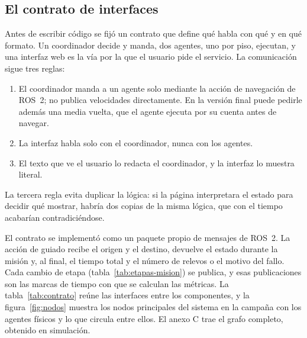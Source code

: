 \subsection{El contrato de interfaces}
\label{sec:contrato}

Antes de escribir código se fijó un contrato que define qué habla con qué y en qué formato. Un coordinador decide y manda, dos agentes, uno
por piso, ejecutan, y una interfaz web es la vía por la que el usuario pide el servicio. La comunicación sigue tres reglas:

\begin{enumerate}[leftmargin=*]
  \item El coordinador manda a un agente solo mediante la acción de navegación
    de ROS~2; no publica velocidades directamente. En la versión final puede
    pedirle además una media vuelta, que el agente ejecuta por su cuenta antes de navegar.
  \item La interfaz habla solo con el coordinador, nunca con los agentes.
  \item El texto que ve el usuario lo redacta el coordinador, y la interfaz lo
    muestra literal.
\end{enumerate}

La tercera regla evita duplicar la lógica: si la página interpretara el estado para decidir qué mostrar, habría dos copias de la misma lógica, que con el tiempo acabarían contradiciéndose.

El contrato se implementó como un paquete propio de mensajes de ROS~2. La acción
de guiado recibe el origen y el destino, devuelve el estado durante la misión y,
al final, el tiempo total y el número de relevos o el motivo del fallo. Cada
cambio de etapa (tabla~\ref{tab:etapas-mision}) se publica, y esas publicaciones
son las marcas de tiempo con que se calculan las métricas. La tabla~\ref{tab:contrato} reúne las interfaces entre los componentes, y la figura~\ref{fig:nodos} muestra los nodos principales del sistema en la campaña con los agentes físicos y lo que circula entre ellos. El anexo C trae el grafo completo, obtenido en simulación.

